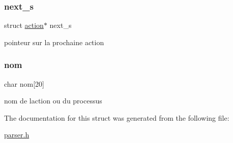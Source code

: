 \subsubsection{\texorpdfstring{next\_s}{next\_s}}
{\footnotesize\ttfamily struct \mbox{\hyperlink{structaction}{action}}$\ast$ next\+\_\+s}

pointeur sur la prochaine action \mbox{\label{structaction_aadad624255828e83c18a11df31c8f559}} 
\subsubsection{\texorpdfstring{nom}{nom}}
{\footnotesize\ttfamily char nom\mbox{[}20\mbox{]}}

nom de l\textquotesingle{}action ou du processus 

The documentation for this struct was generated from the following file\+:\begin{DoxyCompactItemize}
\item 
\mbox{\hyperlink{parser_8h}{parser.\+h}}\end{DoxyCompactItemize}
